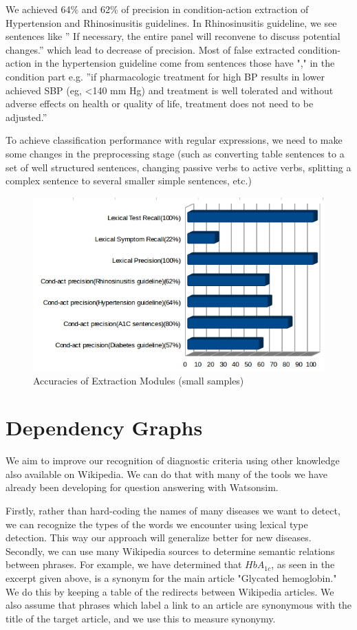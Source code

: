 \documentclass[12pt,letterpaper]{article}
\begin{document}
We achieved 64\% and 62\% of precision in condition-action extraction of Hypertension \cite{doi:10.1001/jama.2013.284427} and Rhinosinusitis\cite{chow2012idsa} guidelines. In Rhinosinusitis guideline, we see sentences like '' If necessary, the entire panel will reconvene to discuss potential changes.'' which lead to decrease of precision. Most of false extracted condition-action in the hypertension guideline come from sentences those have "," in the condition part e.g. ''if pharmacologic treatment for high BP results in lower achieved SBP (eg, \textless 140 mm Hg) and treatment is well tolerated and without adverse effects on health or quality of life, treatment does not need to be adjusted.''


To achieve classification performance with regular expressions, we need to make some changes in the preprocessing stage (such as converting table sentences to a set of well structured sentences, changing passive verbs to active verbs, splitting a complex sentence to several smaller simple sentences, etc.)

\begin{figure}
\includegraphics[width=\textwidth]{accuracies}
\caption{Accuracies of Extraction Modules (small samples)}
\end{figure}

\section{Dependency Graphs}
We aim to improve our recognition of diagnostic criteria using other knowledge also available on Wikipedia. We can do that with many of the tools we have already been developing for question answering with Watsonsim.

Firstly, rather than hard-coding the names of many diseases we want to detect, we can recognize the types of the words we encounter using lexical type detection. This way our approach will generalize better for new diseases.
Secondly, we can use many Wikipedia sources to determine semantic relations between phrases. For example, we have determined that $HbA_{1c}$, as seen in the excerpt given above, is a synonym for the main article "Glycated hemoglobin." We do this by keeping a table of the redirects between Wikipedia articles. We also assume that phrases which label a link to an article are synonymous with the title of the target article, and we use this to measure synonymy.
\end{document}
